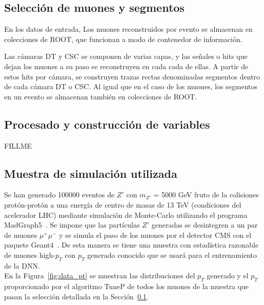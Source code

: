 \subsection{Selecci\'on de muones y segmentos}\label{sec:selection}

En los datos de entrada, Los muones reconstruidos por evento se almacenan en colecciones de ROOT, que funcionan a modo de contenedor de informaci\'on.

Las c\'amaras DT y CSC se componen de varias capas, y las señales o hits que dejan los muones a su paso se reconstruyen en cada cada de ellas. A partir de estos hits por c\'amara, se construyen trazas rectas denominadas segmentos dentro de cada c\'amara DT o CSC. Al igual que en el caso de los muones, los segmentos en un evento se almacenan tambi\'en en colecciones de ROOT.



\subsection{Procesado y construcci\'on de variables}\label{sec:procesado}

FILLME

\subsection{Muestra de simulaci\'on utilizada}\label{sec:sample}

Se han generado 100000 eventos de $Z'$ con $m_{Z'}$ = 5000 GeV fruto de la colisiones prot\'on-prot\'on a una energ\'ia de centro de masas de 13 TeV (condiciones del acelerador LHC) mediante simulaci\'on de Monte-Carlo utilizando el programa MadGraph5~\cite{Alwall:2014hca}. Se impone que las part\'iculas $Z'$ generadas se desintegren a un par de muones $\mu^{+}\mu^{-}$ y se simula el paso de los muones por el detector CMS con el paquete Geant4~\cite{Agostinelli:2002hh}. De esta manera se tiene una muestra con estad\'istica razonable de muones high-$p_{T}$ con $p_{T}$ generado conocido que se usar\'a para el entrenamiento de la DNN. \\

En la Figura~\ref{fig:data_pt} se muestran las distribuciones del $p_{T}$ generado y el $p_{T}$ proporcionado por el algoritmo TuneP de todos los muones de la muestra que pasan la selecci\'on detallada en la Secci\'on~\ref{sec:selection}.

